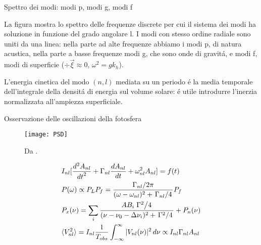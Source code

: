 \documentclass[10pt,xcolor={usenames},fleqn,mathserif,serif]{beamer}
\begin{document}
\begin{wordonframe}{Spettro dei modi: modi p, modi g, modi f}

La figura mostra lo spettro delle frequenze discrete per cui il sistema dei modi ha soluzione in funzione del grado angolare l. I modi con stesso ordine radiale sono uniti da una linea: nella parte ad alte frequenze abbiamo i modi p, di natura acustica, nella parte a basse frequenze modi g, che sono onde di gravit\'a, e modi f, modi di superficie ($\div{\vec{\xi}}\approx0$, $\omega^2=gk_h$). 

L'energia cinetica del modo $(n,l)$ mediata su un periodo \'e la media temporale dell'integrale della densit\'a di energia sul volume solare: \'e utile introdurre l'inerzia normalizzata all'ampiezza superficiale.

\end{wordonframe}

\begin{frame}{Osservazione delle oscillazioni della fotosfera}

\begin{figure}[!ht]


\texttt{[image: PSD]}
\caption{Da \cite{houdek2006stochastic}.}\label{fig:PSD}

\end{figure}

\begin{align*}
&I_{nl}[\TtwoDy{t}{A_{nl}}+\Gamma_{nl}\TDy{t}{A_{nl}}+\omega_{nl}^2A_{nl}]=f(t)\\
&P(\omega)\propto P_LP_f=\frac{\midfrac{\Gamma_{nl}}{2\pi}}{(\omega-\omega_{nl})^2+\midfrac{\Gamma_{nl}}{4}}P_f\\
&P_x(\nu)=\sum_i\frac{AB_i\midfrac{\Gamma^2}{4}}{(\nu-\nu_0-\Delta\nu_i)^2+\midfrac{\Gamma^2}{4}}+P_n(\nu)\\
&\exv{V_{nl}^2}=I_{nl}\frac{1}{T_{obs}}\int_{-\infty}^{\infty}|V_{nl}(\nu)|^2\,d\nu\propto I_{nl}\Gamma_{nl}A_{nl}
\end{align*}


\end{frame}
\end{document}
